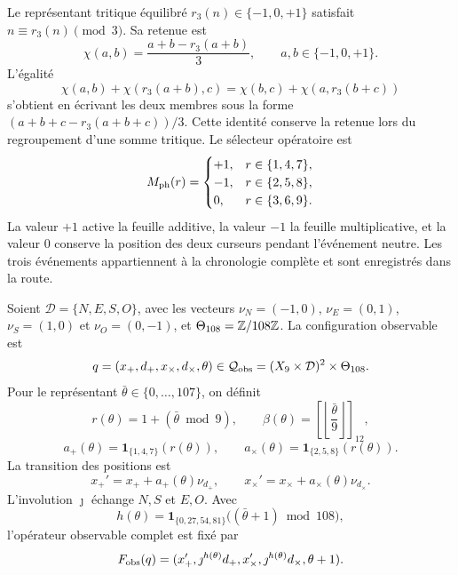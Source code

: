 Le représentant tritique équilibré \(r_3(n)\in\{-1,0,+1\}\) satisfait
\(n\equiv r_3(n)\pmod3\). Sa retenue est
\[
 \chi(a,b)=\frac{a+b-r_3(a+b)}3,\qquad
 a,b\in\{-1,0,+1\}.
\]
L’égalité
\[
 \chi(a,b)+\chi(r_3(a+b),c)
 =\chi(b,c)+\chi(a,r_3(b+c))
\]
s’obtient en écrivant les deux membres sous la forme
\((a+b+c-r_3(a+b+c))/3\). Cette identité conserve la retenue lors du regroupement d’une somme tritique. Le sélecteur opératoire est
\[
 M_{\rm ph}(r)=
 \begin{cases}
 +1,&r\in\{1,4,7\},\\
 -1,&r\in\{2,5,8\},\\
 0,&r\in\{3,6,9\}.
 \end{cases}
\]
La valeur \(+1\) active la feuille additive, la valeur \(-1\) la feuille multiplicative, et la valeur \(0\) conserve la position des deux curseurs pendant l’événement neutre. Les trois événements appartiennent à la chronologie complète et sont enregistrés dans la route.

Soient \(\mathcal D=\{N,E,S,O\}\), avec les vecteurs
\(\nu_N=(-1,0)\), \(\nu_E=(0,1)\), \(\nu_S=(1,0)\) et
\(\nu_O=(0,-1)\), et \(\Theta_{108}=\mathbb Z/108\mathbb Z\). La configuration observable est
\[
 q=(x_+,d_+,x_\times,d_\times,\theta)
 \in\mathcal Q_{\rm obs}=(X_9\times\mathcal D)^2\times\Theta_{108}.
\]
Pour le représentant \(\bar\theta\in\{0,\ldots,107\}\), on définit
\[
 r(\theta)=1+(\bar\theta\bmod9),\qquad
 \beta(\theta)=\left[\left\lfloor\frac{\bar\theta}{9}\right\rfloor\right]_{12},
\]
\[
 a_+(\theta)=\mathbf1_{\{1,4,7\}}(r(\theta)),\qquad
 a_\times(\theta)=\mathbf1_{\{2,5,8\}}(r(\theta)).
\]
La transition des positions est
\[
 x_+'=x_++a_+(\theta)\nu_{d_+},\qquad
 x_\times'=x_\times+a_\times(\theta)\nu_{d_\times}.
\]
L’involution \(\jmath\) échange \(N,S\) et \(E,O\). Avec
\[
 h(\theta)=\mathbf1_{\{0,27,54,81\}}\bigl((\bar\theta+1)\bmod108\bigr),
\]
l’opérateur observable complet est fixé par
\[
 F_{\rm obs}(q)=
 (x_+',\jmath^{h(\theta)}d_+,x_\times',
   \jmath^{h(\theta)}d_\times,\theta+1).
\]

